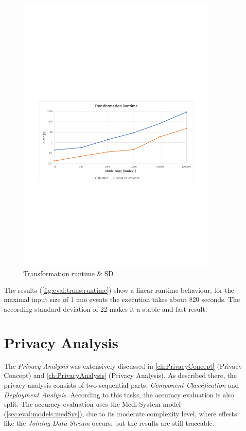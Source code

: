\begin{figure}[h]
	\centering
	\includegraphics[trim = 10mm 90mm 10mm 110mm, clip, width=0.90\textwidth]{graphs/Runtime_Transformation}
	\caption{Transformation runtime \& SD}
	\label{fig:eval:trans:runtime}
\end{figure}

The results (\autoref{fig:eval:trans:runtime}) show a linear runtime behaviour, for the maximal input size of 1 mio events the execution takes about 820 seconds. The according standard deviation of 22 makes it a stable and fast result.

\section{Privacy Analysis}
\label{sec:Evaluation:privacyanalysis}

The \textit{Privacy Analysis} was extensively discussed in \autoref{ch:PrivacyConcept} (Privacy Concept) and \autoref{ch:PrivacyAnalysis} (Privacy Analysis). As described there, the privacy analysis consists of two sequential parts: \textit{Component Classification} and \textit{Deployment Analysis}. According to this tasks, the accuracy evaluation is also split. The accuracy evaluation uses the Medi-System model (\autoref{sec:eval:models:medSys}), due to its moderate complexity level, where effects like the \textit{Joining Data Stream} occurs, but the results are still traceable.

